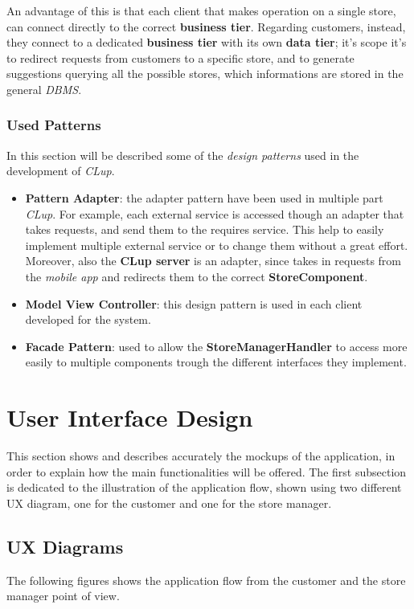 \documentclass{article}
\begin{document}
	An advantage of this is that each client that makes operation on a single store, can connect directly to the correct {\bfseries business tier}. Regarding customers, instead, they connect to a dedicated {\bfseries business tier} with its own {\bfseries data tier}; it's scope it's to redirect requests from customers to a specific store, and to generate suggestions querying all the possible stores, which informations are stored in the general \emph{DBMS}.
	\subsubsection{Used Patterns}
	In this section will be described some of the \emph{design patterns} used in the development of \emph{CLup}.
	\begin{itemize}
		\item {\bfseries Pattern Adapter}: the adapter pattern have been used in multiple part \emph{CLup}. For example, each external service is accessed though an adapter that takes requests, and send them to the requires service. This help to easily implement multiple external service or to change them without a great effort. Moreover, also the {\bfseries CLup server} is an adapter, since takes in requests from the \emph{mobile app} and redirects them to the correct {\bfseries StoreComponent}.
		\item{\bfseries Model View Controller}: this design pattern is used in each client developed for the system.
		\item{\bfseries Facade Pattern}: used to allow the {\bfseries StoreManagerHandler} to access more easily to multiple components trough the different interfaces they implement.
	\end{itemize}
	



\section{User Interface Design}
This section shows and describes accurately the mockups of the application, in order to explain how the main functionalities will be offered. The first subsection is dedicated to the illustration of the application flow, shown using two different UX diagram, one for the customer and one for the store manager.

	\subsection{UX Diagrams}
	The following figures shows the application flow from the customer and the store manager point of view.
	
\end{document}
